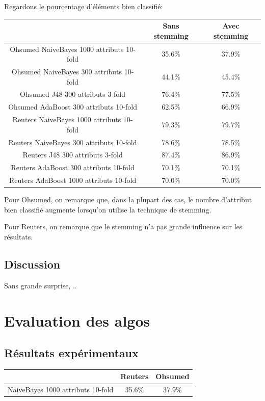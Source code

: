 \documentclass[a4paper,11pt]{article}
\begin{document}
Regardons le pourcentage d'éléments bien classifié:
\begin{center}
\begin{tabular}{ |c|c|c| } 
 \hline
  & Sans stemming & Avec stemming \\ 
 \hline
 Ohsumed NaiveBayes 1000 attributs 10-fold  & 35.6\% & 37.9\% \\ 
 Ohsumed NaiveBayes 300 attributs 10-fold  & 44.1\% & 45.4\% \\ 
 Ohsumed J48 300 attributs 3-fold & 76.4\% & 77.5\% \\ 
 Ohsumed AdaBoost 300 attributs 10-fold & 62.5\% & 66.9\% \\
 \hline
 Reuters NaiveBayes 1000 attributs 10-fold & 79.3\% & 79.7\% \\
 Reuters NaiveBayes 300 attributs 10-fold  & 78.6\% & 78.5\% \\ 
 Reuters J48 300 attributs 3-fold & 87.4\% & 86.9\% \\ 
 Reuters AdaBoost 300 attributs 10-fold & 70.1\% & 70.1\% \\ 
 Reuters AdaBoost 1000 attributs 10-fold & 70.0\% & 70.0\% \\ 
 \hline
\end{tabular}
\end{center}

Pour Ohsumed, on remarque que, dans la plupart des cas, le nombre d'attribut bien classifié augmente lorsqu'on utilise la technique de stemming. 

Pour Reuters, on remarque que le stemming n'a pas grande influence sur les résultats.
\subsection{Discussion}

Sans grande surprise, ..

\section{Evaluation des algos}

\subsection{Résultats expérimentaux}

\begin{center}
\begin{tabular}{ |c|c|c| } 
 \hline
  & Reuters &  Ohsumed\\ 
 \hline
 NaiveBayes 1000 attributs 10-fold  & 35.6\% & 37.9\% \\  
 \hline
\end{tabular}
\end{center}
\end{document}
